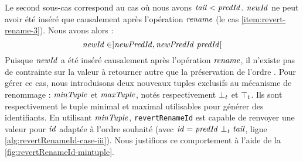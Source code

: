 Le second sous-cas correspond au cas où nous avons $\mathit{tail} < \mathit{predId}$.
$\mathit{newId}$ ne peut avoir été inséré que causalement après l'opération $\mathit{rename}$ (\ie le cas \ref{item:revert-rename-3}).
Nous avons alors :
\[\mathit{newId} \in ]\mathit{newPredId}, \mathit{newPredId~predId}[\]
Puisque $\mathit{newId}$ a été inséré causalement après l'opération $\mathit{rename}$, il n'existe pas de contrainte sur la valeur à retourner autre que la préservation de l'ordre .
Pour gérer ce cas, nous introduisons deux nouveaux tuples exclusifs au mécanisme de renommage : $\mathit{minTuple}$ et $\mathit{maxTuple}$, notés respectivement $\bot_t$ et $\top_t$.
Ils sont respectivement le tuple minimal et maximal utilisables pour générer des identifiants.
En utilisant $\mathit{minTuple}$, \texttt{revertRenameId} est capable de renvoyer une valeur pour $\mathit{id}$ adaptée à l'ordre souhaité (avec $\mathit{id} = \mathit{predId~\bot_t~tail}$, ligne \ref{alg:revertRenameId-case-iii}).
Nous justifions ce comportement à l'aide de la \autoref{fig:revertRenameId-mintuple}.

